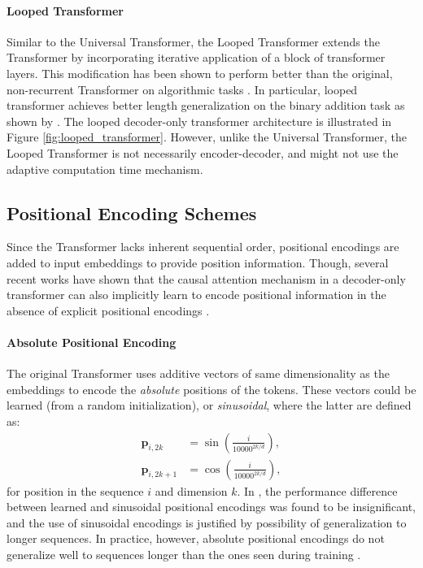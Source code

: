\paragraph{Looped Transformer}
Similar to the Universal Transformer, the Looped Transformer \parencite{yang_looped_2023} extends the Transformer by incorporating iterative application of a block of transformer layers. This modification has been shown to perform better than the original, non-recurrent Transformer on algorithmic tasks \parencite{csordas_systematic_2023,yang_looped_2023}. In particular, looped transformer achieves better length generalization on the binary addition task as shown by \cite{fan_looped_2024}. The looped decoder-only transformer architecture is illustrated in Figure \ref{fig:looped_transformer}. However, unlike the Universal Transformer, the Looped Transformer is not necessarily encoder-decoder, and might not use the adaptive computation time mechanism.

\subsection{Positional Encoding Schemes}\label{subsec:positional_encoding}

Since the Transformer lacks inherent sequential order, positional encodings are added to input embeddings to provide position information. Though, several recent works have shown that the causal attention mechanism in a decoder-only transformer can also implicitly learn to encode positional information in the absence of explicit positional encodings \parencite{haviv_transformer_2022,zuo_breaking_2024,zhou_transformers_2024}.

\paragraph{Absolute Positional Encoding}\label{subsec:absolute_pos_enc}
The original Transformer \parencite{vaswani_attention_2017} uses additive vectors of same dimensionality as the embeddings to encode the \emph{absolute} positions of the tokens. These vectors could be learned (from a random initialization), or \emph{sinusoidal}, where the latter are defined as:
\begin{align*}
    \mathbf{p}_{i,2k}   & = \sin\left( \frac{i}{10000^{2k/d}} \right), \\
    \mathbf{p}_{i,2k+1} & = \cos\left( \frac{i}{10000^{2k/d}} \right),
\end{align*}
for position in the sequence $i$ and dimension $k$. In \cite{vaswani_attention_2017}, the performance difference between learned and sinusoidal positional encodings was found to be insignificant, and the use of sinusoidal encodings is justified by possibility of generalization to longer sequences. In practice, however, absolute positional encodings do not generalize well to sequences longer than the ones seen during training \parencite{press_train_2021}.

